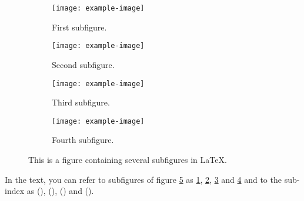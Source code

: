 \documentclass{article}
\begin{document}
\begin{figure}
\centering
\begin{subfigure}{0.45\textwidth}
    \texttt{[image: example-image]}
    \caption{First subfigure.}
    \label{first}
\end{subfigure}
\hfill
\vspace{1em}
\begin{subfigure}{0.45\textwidth}
    \texttt{[image: example-image]}
    \caption{Second subfigure.}
    \label{second}
\end{subfigure}

\begin{subfigure}{0.45\textwidth}
    \texttt{[image: example-image]}
    \caption{Third subfigure.}
    \label{third}
\end{subfigure}
\hfill
\begin{subfigure}{0.45\textwidth}
    \texttt{[image: example-image]}
    \caption{Fourth subfigure.}
    \label{fourth}
\end{subfigure}
        
\caption{This is a figure containing several subfigures in \LaTeX.}
\label{figures}


\end{figure}

\begin{flushleft}
In the text, you can refer to subfigures of figure \ref{figures} as \ref{first}, \ref{second}, \ref{third} and \ref{fourth} and to the sub-index as (), (), () and ().
\end{flushleft}

\listoffigures
\end{document}
